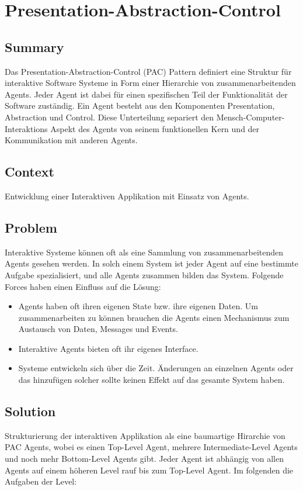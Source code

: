 \chapter{Presentation-Abstraction-Control}

\section{Summary}
Das Presentation-Abstraction-Control (PAC) Pattern definiert eine Struktur für interaktive Software Systeme in Form einer Hierarchie von zusammenarbeitenden Agents. Jeder Agent ist dabei für einen spezifischen Teil der Funktionalität der Software zuständig. Ein Agent besteht aus den Komponenten Presentation, Abstraction und Control. Diese Unterteilung separiert den Mensch-Computer-Interaktions Aspekt des Agents von seinem funktionellen Kern und der Kommunikation mit anderen Agents.
\section{Context}
Entwicklung einer Interaktiven Applikation mit Einsatz von Agents.
\section{Problem}
Interaktive Systeme können oft als eine Sammlung von zusammenarbeitenden Agents gesehen werden. In solch einem System ist jeder Agent auf eine bestimmte Aufgabe spezialisiert, und alle Agents zusammen bilden das System. Folgende Forces haben einen Einfluss auf die Lösung:
\begin{itemize}
	\item Agents haben oft ihren eigenen State bzw. ihre eigenen Daten. Um zusammenarbeiten zu können brauchen die Agents einen Mechanismus zum Austausch von Daten, Messages und Events.
	\item Interaktive Agents bieten oft ihr eigenes Interface.
	\item Systeme entwickeln sich über die Zeit. Änderungen an einzelnen Agents oder das hinzufügen solcher sollte keinen Effekt auf das gesamte System haben.
\end{itemize}
\section{Solution}
Strukturierung der interaktiven Applikation als eine baumartige Hirarchie von PAC Agents, wobei es einen Top-Level Agent, mehrere Intermediate-Level Agents und noch mehr Bottom-Level Agents gibt. Jeder Agent ist abhängig von allen Agents auf einem höheren Level rauf bis zum Top-Level Agent. Im folgenden die Aufgaben der Level:
